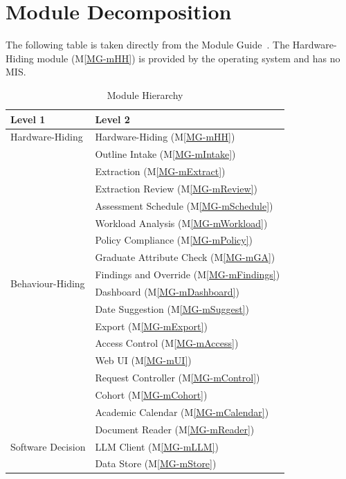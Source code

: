 \documentclass[12pt, titlepage]{article}
\newcommand{\mref}[1]{M\ref{MG-#1}}
\begin{document}
\section{Module Decomposition} \label{SecMD}

The following table is taken directly from the Module
Guide~\citep{TeamBVSH2026MG}. The Hardware-Hiding module (\mref{mHH}) is
provided by the operating system and has no MIS.

\begin{table}[h!]
\centering
\begin{tabular}{p{} p{}}
\toprule
\textbf{Level 1} & \textbf{Level 2}\\
\midrule

{Hardware-Hiding} & Hardware-Hiding (\mref{mHH})\\
\midrule

\multirow{16}{0.3\textwidth}{Behaviour-Hiding}
& Outline Intake (\mref{mIntake})\\
& Extraction (\mref{mExtract})\\
& Extraction Review (\mref{mReview})\\
& Assessment Schedule (\mref{mSchedule})\\
& Workload Analysis (\mref{mWorkload})\\
& Policy Compliance (\mref{mPolicy})\\
& Graduate Attribute Check (\mref{mGA})\\
& Findings and Override (\mref{mFindings})\\
& Dashboard (\mref{mDashboard})\\
& Date Suggestion (\mref{mSuggest})\\
& Export (\mref{mExport})\\
& Access Control (\mref{mAccess})\\
& Web UI (\mref{mUI})\\
& Request Controller (\mref{mControl})\\
& Cohort (\mref{mCohort})\\
& Academic Calendar (\mref{mCalendar})\\
\midrule

\multirow{3}{0.3\textwidth}{Software Decision}
& Document Reader (\mref{mReader})\\
& LLM Client (\mref{mLLM})\\
& Data Store (\mref{mStore})\\
\bottomrule

\end{tabular}
\caption{Module Hierarchy}
\label{TblMH}
\end{table}
\end{document}

